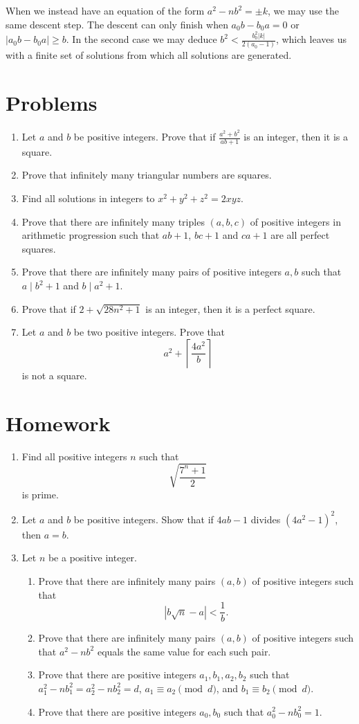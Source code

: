 \documentclass{article}
\begin{document}
When we instead have an equation of the form $a^2-nb^2=\pm k$, we may use the
same descent step. The descent
can only finish when $a_0 b-b_0 a=0$ or $|a_0 b-b_0 a|\ge b$. In the second case 
we may deduce
$b^2<\frac{b_0^2|k|}{2(a_0-1)}$,
which leaves us with a finite set of solutions from which all solutions are
generated.
\newpage
\section{Problems}
\begin{enumerate}
  \item Let $a$ and $b$ be positive integers.
    Prove that if \(\frac{a^2+b^2}{ab+1}\) is an integer, then it is a square.
  \item Prove that infinitely many triangular numbers are squares.
  \item Find all solutions in integers to $x^2+y^2+z^2=2xyz$.
  \item Prove that there are infinitely many triples $(a,b,c)$ of positive
    integers in arithmetic progression
    such that $ab+1$, $bc+1$ and $ca+1$ are all perfect squares.
  \item Prove that there are infinitely many pairs of positive integers $a,b$
    such that $a\mid b^2+1$ and $b\mid a^2+1$.
\item Prove that if $2+\sqrt{28n^2+1}$ is an integer, then it is a perfect
    square.
  \item Let $a$ and $b$ be two positive integers. Prove that
    \[a^2+\left\lceil\frac{4a^2}b\right\rceil\] is not a square.
\end{enumerate}
\newpage
\section{Homework}
  \begin{enumerate}
    \item Find all positive integers $n$ such that \[\sqrt{\frac{7^n+1}2}\] is
      prime.
    \item Let $a$ and $b$ be positive integers. Show that if $4ab-1$ divides
      $(4a^2-1)^2$, then $a=b$.
    \item Let $n$ be a positive integer.
    \begin{enumerate}
        \item Prove that there are infinitely many pairs $(a,b)$ of positive
            integers such that
            \[
                \left|b\sqrt n-a\right|<\frac 1b.
            \]
        \item Prove that there are infinitely many pairs $(a,b)$ of positive
            integers such that $a^2-nb^2$ equals the same value for each such pair.
        \item Prove that there are positive integers $a_1,b_1,a_2,b_2$
            such that $a_1^2-nb_1^2=a_2^2-nb_2^2=d$, $a_1\equiv a_2\pmod d$, and
            $b_1\equiv b_2\pmod d$.
        \item Prove that there are positive integers $a_0,b_0$ such that
            $a_0^2-nb_0^2=1$.
    \end{enumerate}
  \end{enumerate}
\end{document}
